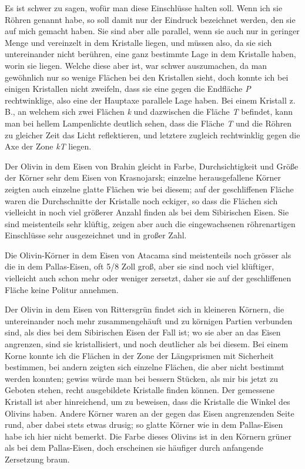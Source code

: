 \documentclass[a4paper, 11pt, oneside]{article}
\begin{document}
Es ist schwer zu sagen, wofür man diese Einschlüsse halten soll. Wenn ich sie Röhren genannt habe, so soll damit nur der Eindruck bezeichnet werden, den sie auf mich gemacht haben. Sie sind aber alle parallel, wenn sie auch nur in geringer Menge und vereinzelt in dem Kristalle liegen, und müssen also, da sie sich untereinander nicht berühren, eine ganz bestimmte Lage in dem Kristalle haben, worin sie liegen. Welche diese aber ist, war schwer auszumachen, da man gewöhnlich nur so wenige Flächen bei den Kristallen sieht, doch konnte ich bei einigen Kristallen nicht zweifeln, dass sie eine gegen die Endfläche \emph{P} rechtwinklige, also eine der Hauptaxe parallele Lage haben. Bei einem Kristall z. B., an welchem sich zwei Flächen \emph{k} und dazwischen die Fläche \emph{T} befindet, kann man bei hellem Lampenlichte deutlich sehen, dass die Fläche \emph{T} und die Röhren zu gleicher Zeit das Licht reflektieren, und letztere zugleich rechtwinklig gegen die Axe der Zone \emph{kT} liegen.

Der Olivin in dem Eisen von Brahin gleicht in Farbe, Durchsichtigkeit und Größe der Körner sehr dem Eisen von Krasnojarsk; einzelne herausgefallene Körner zeigten auch einzelne glatte Flächen wie bei diesem; auf der geschliffenen Fläche waren die Durchschnitte der Kristalle noch eckiger, so dass die Flächen sich vielleicht in noch viel größerer Anzahl finden als bei dem Sibirischen Eisen. Sie sind meistenteils sehr klüftig, zeigen aber auch die eingewachsenen röhrenartigen Einschlüsse sehr ausgezeichnet und in großer Zahl.

Die Olivin-Körner in dem Eisen von Atacama sind meistenteils noch grösser als die in dem Pallas-Eisen, oft 5/8 Zoll groß, aber sie sind noch viel klüftiger, vielleicht auch schon mehr oder weniger zersetzt, daher sie auf der geschliffenen Fläche keine Politur annehmen.

Der Olivin in dem Eisen von Rittersgrün findet sich in kleineren Körnern, die untereinander noch mehr zusammengehäuft und zu körnigen Partien verbunden sind, als dies bei dem Sibirischen Eisen der Fall ist; wo sie aber an das Eisen angrenzen, sind sie kristallisiert, und noch deutlicher als bei diesem. Bei einem Korne konnte ich die Flächen in der Zone der Längsprismen mit Sicherheit bestimmen, bei andern zeigten sich einzelne Flächen, die aber nicht bestimmt werden konnten; gewiss würde man bei bessern Stücken, als mir bis jetzt zu Geboten stehen, recht ausgebildete Kristalle finden können. Der gemessene Kristall ist aber hinreichend, um zu beweisen, dass die Kristalle die Winkel des Olivins haben. Andere Körner waren an der gegen das Eisen angrenzenden Seite rund, aber dabei stets etwas drusig; so glatte Körner wie in dem Pallas-Eisen habe ich hier nicht bemerkt. Die Farbe dieses Olivins ist in den Körnern grüner als bei dem Pallas-Eisen, doch erscheinen sie häufiger durch anfangende Zersetzung braun.
\end{document}
